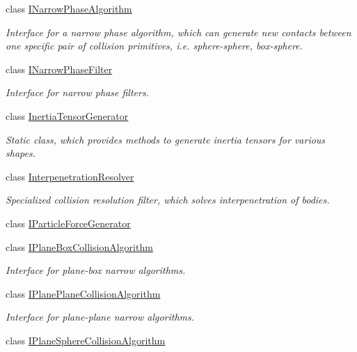 \begin{DoxyCompactItemize}
class \mbox{\hyperlink{classr3_1_1_i_narrow_phase_algorithm}{I\+Narrow\+Phase\+Algorithm}}
\begin{DoxyCompactList}\small\item\em Interface for a narrow phase algorithm, which can generate new contacts between one specific pair of collision primitives, i.\+e. sphere-\/sphere, box-\/sphere. \end{DoxyCompactList}\item 
class \mbox{\hyperlink{classr3_1_1_i_narrow_phase_filter}{I\+Narrow\+Phase\+Filter}}
\begin{DoxyCompactList}\small\item\em Interface for narrow phase filters. \end{DoxyCompactList}\item 
class \mbox{\hyperlink{classr3_1_1_inertia_tensor_generator}{Inertia\+Tensor\+Generator}}
\begin{DoxyCompactList}\small\item\em Static class, which provides methods to generate inertia tensors for various shapes. \end{DoxyCompactList}\item 
class \mbox{\hyperlink{classr3_1_1_interpenetration_resolver}{Interpenetration\+Resolver}}
\begin{DoxyCompactList}\small\item\em Specialized collision resolution filter, which solves interpenetration of bodies. \end{DoxyCompactList}\item 
class \mbox{\hyperlink{classr3_1_1_i_particle_force_generator}{I\+Particle\+Force\+Generator}}
\item 
class \mbox{\hyperlink{classr3_1_1_i_plane_box_collision_algorithm}{I\+Plane\+Box\+Collision\+Algorithm}}
\begin{DoxyCompactList}\small\item\em Interface for plane-\/box narrow algorithms. \end{DoxyCompactList}\item 
class \mbox{\hyperlink{classr3_1_1_i_plane_plane_collision_algorithm}{I\+Plane\+Plane\+Collision\+Algorithm}}
\begin{DoxyCompactList}\small\item\em Interface for plane-\/plane narrow algorithms. \end{DoxyCompactList}\item 
class \mbox{\hyperlink{classr3_1_1_i_plane_sphere_collision_algorithm}{I\+Plane\+Sphere\+Collision\+Algorithm}}

\end{DoxyCompactItemize}
